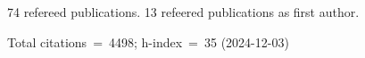 74 refereed publications. 13 refeered publications as first author.

Total citations~=~4498; h-index~=~35 (2024-12-03)